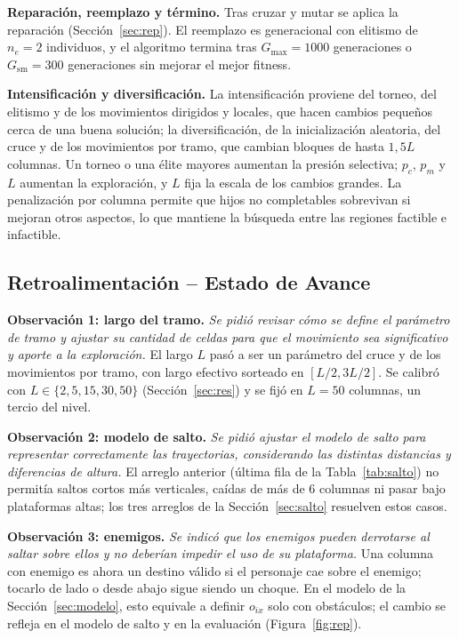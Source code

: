 \documentclass[letter, 10pt]{article}
\begin{document}
\textbf{Reparaci\'on, reemplazo y t\'ermino.} Tras cruzar y mutar se aplica la reparaci\'on (Secci\'on~\ref{sec:rep}). El reemplazo es generacional con elitismo de $n_e=2$ individuos, y el algoritmo termina tras $G_{\max}=1000$ generaciones o $G_{\text{sm}}=300$ generaciones sin mejorar el mejor fitness.

\textbf{Intensificaci\'on y diversificaci\'on.} La intensificaci\'on proviene del torneo, del elitismo y de los movimientos dirigidos y locales, que hacen cambios peque\~nos cerca de una buena soluci\'on; la diversificaci\'on, de la inicializaci\'on aleatoria, del cruce y de los movimientos por tramo, que cambian bloques de hasta $1{,}5L$ columnas. Un torneo o una \'elite mayores aumentan la presi\'on selectiva; $p_c$, $p_m$ y $L$ aumentan la exploraci\'on, y $L$ fija la escala de los cambios grandes. La penalizaci\'on por columna permite que hijos no completables sobrevivan si mejoran otros aspectos, lo que mantiene la b\'usqueda entre las regiones factible e infactible.

\subsection{Retroalimentaci\'on -- Estado de Avance}\label{sec:retro}
\textbf{Observaci\'on 1: largo del tramo.} \emph{Se pidi\'o revisar c\'omo se define el par\'ametro de tramo y ajustar su cantidad de celdas para que el movimiento sea significativo y aporte a la exploraci\'on.} El largo $L$ pas\'o a ser un par\'ametro del cruce y de los movimientos por tramo, con largo efectivo sorteado en $[L/2,3L/2]$. Se calibr\'o con $L\in\{2,5,15,30,50\}$ (Secci\'on~\ref{sec:res}) y se fij\'o en $L=50$ columnas, un tercio del nivel.

\textbf{Observaci\'on 2: modelo de salto.} \emph{Se pidi\'o ajustar el modelo de salto para representar correctamente las trayectorias, considerando las distintas distancias y diferencias de altura.} El arreglo anterior (\'ultima fila de la Tabla~\ref{tab:salto}) no permit\'ia saltos cortos m\'as verticales, ca\'idas de m\'as de 6 columnas ni pasar bajo plataformas altas; los tres arreglos de la Secci\'on~\ref{sec:salto} resuelven estos casos.

\textbf{Observaci\'on 3: enemigos.} \emph{Se indic\'o que los enemigos pueden derrotarse al saltar sobre ellos y no deber\'ian impedir el uso de su plataforma.} Una columna con enemigo es ahora un destino v\'alido si el personaje cae sobre el enemigo; tocarlo de lado o desde abajo sigue siendo un choque. En el modelo de la Secci\'on~\ref{sec:modelo}, esto equivale a definir $o_{ix}$ solo con obst\'aculos; el cambio se refleja en el modelo de salto y en la evaluaci\'on (Figura~\ref{fig:rep}).
\end{document}
